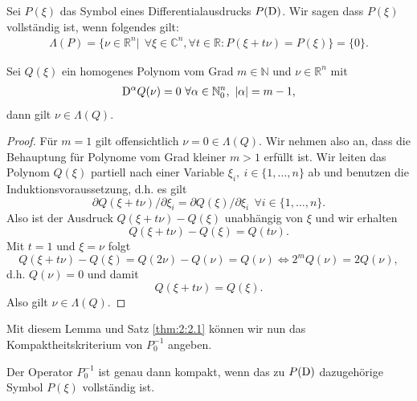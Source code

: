 \begin{df}
Sei $P(\xi)$ das Symbol eines Differentialausdrucks $P(\mathrm D)$. Wir sagen dass $P(\xi)$ vollständig ist, wenn folgendes gilt:
\begin{align*}
\Lambda(P)=\{ \nu \in \mathbb{R}^n| \ \ \forall \xi \in \mathbb{C}^n, \forall t \in \mathbb{R}: P(\xi + t\nu) = P(\xi)  \} = \{0\}.
\end{align*}
\end{df}
\begin{lem}\label{Lema:homogene Polynome} 
Sei $Q(\xi)$ ein homogenes Polynom vom Grad $m \in \mathbb{N}$ und  $\nu \in \mathbb{R}^n$ mit
\begin{align*}
\mathrm D^{\alpha}Q(\nu)=0 \ \forall \alpha \in \mathbb{N}_0^{n}, \ |\alpha| = m-1,
\end{align*}
dann gilt $\nu \in \Lambda(Q)$.
\end{lem}
\begin{proof}
Für $m=1$ gilt offensichtlich $\nu = 0 \in \Lambda(Q)$. Wir nehmen also an, dass die Behauptung für Polynome vom Grad kleiner $m>1$ erfüllt ist. Wir leiten das Polynom $Q(\xi)$ partiell nach einer Variable $\xi_i, \ i \in \{1,\ldots,n\}$ ab und benutzen die Induktionsvoraussetzung, d.h. es gilt
\begin{equation}
\partial Q(\xi + t \nu)/ \partial \xi_i = \partial Q(\xi)/\partial \xi_i \ \ \forall i \in \{1,\ldots,n\}.
\end{equation}
Also ist der Ausdruck $Q(\xi + t \nu) - Q(\xi)$ unabhängig von $\xi$ und wir erhalten
\begin{equation}
Q(\xi + t \nu) - Q(\xi) = Q(t \nu).
\end{equation}
Mit $t=1$ und $\xi=\nu$ folgt
\begin{equation}
Q(\xi + t\nu) - Q(\xi) = Q(2 \nu) - Q(\nu)= Q(\nu) \Leftrightarrow 2^m Q(\nu) = 2 Q(\nu),
\end{equation}
d.h. $Q(\nu)=0$ und damit 
\begin{equation}
Q(\xi + t\nu) = Q(\xi).
\end{equation}
Also gilt $\nu \in \Lambda(Q)$.
\end{proof}
Mit diesem Lemma und Satz \ref{thm:2:2.1} können wir nun das Kompaktheitskriterium von $P_0^{-1}$ angeben.
\begin{thm}
Der Operator $P_0^{-1}$ ist genau dann kompakt, wenn das zu $P(\mathrm D)$ dazugehörige Symbol $P(\xi)$ vollständig ist.
\end{thm}
